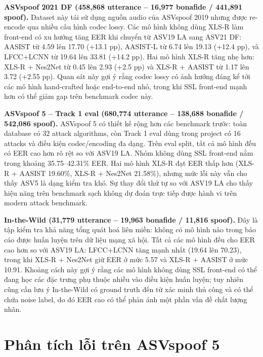 \textbf{ASVspoof 2021 DF (458,868 utterance -- 16,977 bonafide / 441,891 spoof).} Dataset này tái sử dụng nguồn audio của ASVspoof 2019 nhưng được re-encode qua nhiều cấu hình codec lossy. Các mô hình không dùng XLS-R làm front-end có xu hướng tăng EER khi chuyển từ ASV19 LA sang ASV21 DF: AASIST từ 4.59 lên 17.70 (+13.1 pp), AASIST-L từ 6.74 lên 19.13 (+12.4 pp), và LFCC+LCNN từ 19.64 lên 33.81 (+14.2 pp). Hai mô hình XLS-R tăng nhẹ hơn: XLS-R + Nes2Net từ 0.45 lên 2.93 (+2.5 pp) và XLS-R + AASIST từ 1.17 lên 3.72 (+2.55 pp). Quan sát này gợi ý rằng codec lossy có ảnh hưởng đáng kể tới các mô hình hand-crafted hoặc end-to-end nhỏ, trong khi SSL front-end mạnh hơn có thể giảm gap trên benchmark codec này.

\textbf{ASVspoof 5 -- Track 1 eval (680,774 utterance -- 138,688 bonafide / 542,086 spoof).} ASVspoof 5 có thiết kế rộng hơn các benchmark trước: toàn database có 32 attack algorithms, còn Track 1 eval dùng trong project có 16 attacks và điều kiện codec/encoding đa dạng. Trên eval split, tất cả mô hình đều có EER cao hơn rõ rệt so với ASV19 LA. Nhóm không dùng SSL front-end nằm trong khoảng 35.75--42.31\% EER. Hai mô hình XLS-R đạt EER thấp hơn (XLS-R + AASIST 19.60\%, XLS-R + Nes2Net 21.58\%), nhưng mức lỗi này vẫn cho thấy ASV5 là dạng kiểm tra khó. Sự thay đổi thứ tự so với ASV19 LA cho thấy hiệu năng trên benchmark sạch không dự đoán trực tiếp được hành vi trên modern attack benchmark.

\textbf{In-the-Wild (31,779 utterance -- 19,963 bonafide / 11,816 spoof).} Đây là tập kiểm tra khả năng tổng quát hoá liên miền: không có mô hình nào trong báo cáo được huấn luyện trên dữ liệu mạng xã hội. Tất cả các mô hình đều cho EER cao hơn so với ASV19 LA: LFCC+LCNN tăng mạnh nhất (19.64 lên 70.23), trong khi XLS-R + Nes2Net giữ EER ở mức 5.57 và XLS-R + AASIST ở mức 10.91. Khoảng cách này gợi ý rằng các mô hình không dùng SSL front-end có thể đang học các đặc trưng phụ thuộc nhiều vào điều kiện huấn luyện; tuy nhiên cũng cần lưu ý In-the-Wild có ground truth đến từ xác minh thủ công và có thể chứa noise label, do đó EER cao có thể phản ánh một phần vấn đề chất lượng nhãn.

\section{Phân tích lỗi trên ASVspoof 5} \label{sec:error-analysis}

